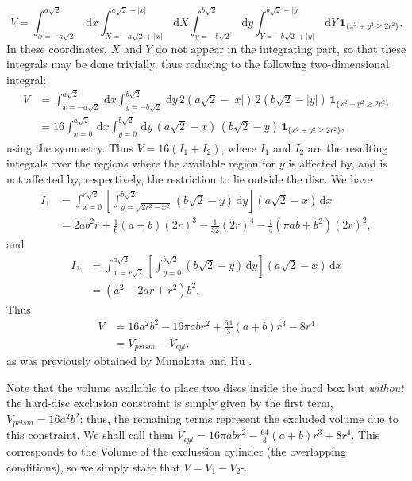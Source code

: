 \documentclass[a4paper,10pt, jcp, aps, preprint]{revtex4-1}
\newcommand{\rd}{\, \mathrm{d}}
\newcommand{\indicator}[1]{\mathbf{1}_{ \{   #1 \} } }
\begin{document}
\begin{equation}\label{integraltotal}
 V = \int_{x=-a \sqrt{2}}^{a \sqrt{2}} \rd x 
\int_{X=-a \sqrt{2} + |x| }^{a \sqrt{2} - |x|}  \rd X
 \int_{y=-b \sqrt{2}}^{b \sqrt{2}} \rd y
\int_{Y=-b \sqrt{2} + |y| }^{b \sqrt{2}-|y|}  \rd Y
\, \indicator{ x^2 + y^2 \ge 2r^2  }.
\end{equation}
In these coordinates, $X$ and $Y$ do not appear in the integrating part, 
so that these integrals may be done trivially, 
thus reducing to the following two-dimensional integral:
\begin{align}
 V &= \int_{x=-a \sqrt{2}}^{a \sqrt{2}} \rd x  \int_{y=-b \sqrt{2}}^{b \sqrt{2}} \rd y
\, 2 \left( a \sqrt{2} - |x| \right) \, 2 \left( b \sqrt{2} - |y| \right) \,  \indicator{ x^2 + y^2 \ge 2r^2 } \\
&= 16 \int_{x=0}^{a \sqrt{2}} \rd x  \int_{y=0}^{b \sqrt{2}} \rd y
\, \left( a \sqrt{2} - x \right) \, \left( b \sqrt{2} - y \right) \,  \indicator{ x^2 + y^2 \ge 2r^2 },
\end{align}
using the symmetry.
Thus $V = 16(I_1 + I_2)$, where $I_1$ and $I_2$ are the 
resulting integrals over the regions where the available region 
for $y$ is affected by, and is not affected by, respectively, 
the restriction to lie outside the disc.
We have
\begin{align}
 I_1 &= \int_{x=0}^{r\sqrt{2}} \left[ \int_{y = \sqrt{ 2r^2 - x^2}}^{b \sqrt{2}} \left( b \sqrt{2} - y \right) \rd y \right]  \left( a \sqrt{2} - x \right) \rd x \\
&= 	
2 a b^{2} r  + \textstyle \frac{1}{6} (a+b) (2r)^{3} - \frac{1}{32}  (2r)^{4} - \frac{1}{4} {\left(\pi a b + b^{2}\right)} (2r)^2,
\end{align}
and
\begin{align}
 I_2 &= \int_{x=r  \sqrt{2}}^{a \sqrt{2}} \left[ \int_{y = 0}^{b \sqrt{2}} \left( b \sqrt{2} - y \right) \rd y \right]  \left( a \sqrt{2} - x \right) \rd x \\
&=	
{\left( a^{2} - 2ar +   r^{2}\right)} b^{2}.
\end{align}
Thus 
\begin{align}\label{volumeabd}
 V %
 & =  16 a^{2} b^{2}  - 16 \pi a b r^{2} + \textstyle \frac{64}{3} (a+b) r^{3}  - 8 r^{4} \\
&= V_{prism} - V_{cyl},
\end{align}
as was previously obtained by Munakata and Hu \cite{Munakata02}.

Note that the volume available to place two discs inside 
the hard box but \emph{without} the 
 hard-disc exclusion constraint is simply 
given by the first term, $V_{prism}=16 a^2 b^2$; 
thus, the remaining terms represent the excluded volume due to this constraint.
We shall call them $V_{cyl}=  16 \pi a b r^{2} - \textstyle \frac{64}{3} (a+b) r^{3}  + 8 r^{4}$.
This corresponds to the Volume of the exclussion cylinder (the overlapping conditions),
so we simply state that $V=V_1 - V_2$-.
\end{document}
